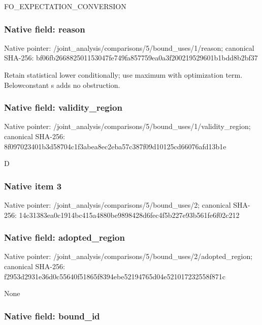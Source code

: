 \documentclass[10pt,a4paper]{article}
\begin{document}
FO\_EXPECTATION\_CONVERSION


\subsubsection{Native field: reason}


Native pointer: /joint\_analysis/comparis\allowbreak{}ons/5/bound\_uses/1/reaso\allowbreak{}n; canonical SHA-256: bf06fb266882501153047fe7\allowbreak{}49fa857759ea0a3f20021952\allowbreak{}9601b1bdd8b2bf37


Retain statistical lower conditionally; use maximum with optimization term. Belowconstant s adds no obstruction.


\subsubsection{Native field: validity\_region}


Native pointer: /joint\_analysis/comparis\allowbreak{}ons/5/bound\_uses/1/valid\allowbreak{}ity\_region; canonical SHA-256: 8f097023401b3d58704c1f3a\allowbreak{}bea8ec2eba57c387f09d1012\allowbreak{}5cd66076afd13b1e


D


\subsubsection{Native item 3}


Native pointer: /joint\_analysis/comparis\allowbreak{}ons/5/bound\_uses/2; canonical SHA-256: 14c31383ea0c1914bc415a48\allowbreak{}80be9898428d6fec4f5b227e\allowbreak{}93b561fe6f02c212



\subsubsection{Native field: adopted\_region}


Native pointer: /joint\_analysis/comparis\allowbreak{}ons/5/bound\_uses/2/adopt\allowbreak{}ed\_region; canonical SHA-256: f2953d2931e36d0c55640f51\allowbreak{}865f8394ebe52194765d04e5\allowbreak{}21017232558f871c


None


\subsubsection{Native field: bound\_id}
\end{document}
